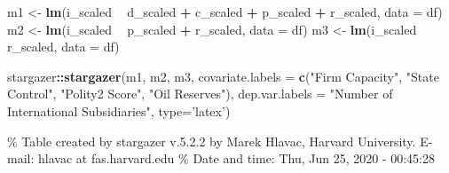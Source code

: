 \documentclass[11pt,]{book}
\newenvironment{Shaded}{\begin{snugshade}}{\end{snugshade}}
\newcommand{\DataTypeTok}[1]{\textcolor[rgb]{0.13,0.29,0.53}{#1}}
\newcommand{\KeywordTok}[1]{\textcolor[rgb]{0.13,0.29,0.53}{\textbf{#1}}}
\newcommand{\NormalTok}[1]{#1}
\newcommand{\OperatorTok}[1]{\textcolor[rgb]{0.81,0.36,0.00}{\textbf{#1}}}
\newcommand{\StringTok}[1]{\textcolor[rgb]{0.31,0.60,0.02}{#1}}
\begin{document}
\begin{Shaded}
\begin{Highlighting}[]
\NormalTok{m1 <-}\StringTok{ }\KeywordTok{lm}\NormalTok{(i_scaled }\OperatorTok{~}\StringTok{ }\NormalTok{d_scaled }\OperatorTok{+}\StringTok{ }\NormalTok{c_scaled }\OperatorTok{+}\StringTok{ }\NormalTok{p_scaled }\OperatorTok{+}\StringTok{ }\NormalTok{r_scaled, }\DataTypeTok{data =}\NormalTok{ df)}
\NormalTok{m2 <-}\StringTok{ }\KeywordTok{lm}\NormalTok{(i_scaled }\OperatorTok{~}\StringTok{ }\NormalTok{p_scaled }\OperatorTok{+}\StringTok{ }\NormalTok{r_scaled, }\DataTypeTok{data =}\NormalTok{ df)}
\NormalTok{m3 <-}\StringTok{ }\KeywordTok{lm}\NormalTok{(i_scaled }\OperatorTok{~}\StringTok{ }\NormalTok{r_scaled, }\DataTypeTok{data =}\NormalTok{ df)}
\end{Highlighting}
\end{Shaded}

\begin{Shaded}
\begin{Highlighting}[]
\NormalTok{stargazer}\OperatorTok{::}\KeywordTok{stargazer}\NormalTok{(m1, m2, m3, }
          \DataTypeTok{covariate.labels =} \KeywordTok{c}\NormalTok{(}\StringTok{"Firm Capacity"}\NormalTok{, }
                               \StringTok{"State Control"}\NormalTok{, }
                               \StringTok{"Polity2 Score"}\NormalTok{, }
                               \StringTok{"Oil Reserves"}\NormalTok{),}
          \DataTypeTok{dep.var.labels   =} \StringTok{"Number of International Subsidiaries"}\NormalTok{,}
          \DataTypeTok{type=}\StringTok{'latex'}\NormalTok{)}
\end{Highlighting}
\end{Shaded}

\% Table created by stargazer v.5.2.2 by Marek Hlavac, Harvard University. E-mail: hlavac at fas.harvard.edu
\% Date and time: Thu, Jun 25, 2020 - 00:45:28
\end{document}
